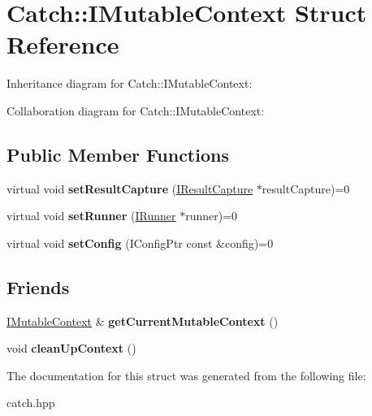 \hypertarget{structCatch_1_1IMutableContext}{}\section{Catch\+:\+:I\+Mutable\+Context Struct Reference}
\label{structCatch_1_1IMutableContext}


Inheritance diagram for Catch\+:\+:I\+Mutable\+Context\+:


Collaboration diagram for Catch\+:\+:I\+Mutable\+Context\+:
\subsection*{Public Member Functions}
\begin{DoxyCompactItemize}
\item 
\mbox{\label{structCatch_1_1IMutableContext_a4a80afd0525b7def21bee8d9b48f2d39}} 
virtual void {\bfseries set\+Result\+Capture} (\hyperlink{structCatch_1_1IResultCapture}{I\+Result\+Capture} $\ast$result\+Capture)=0
\item 
\mbox{\label{structCatch_1_1IMutableContext_af2e53b1dea4527a2587cff266a730f6e}} 
virtual void {\bfseries set\+Runner} (\hyperlink{structCatch_1_1IRunner}{I\+Runner} $\ast$runner)=0
\item 
\mbox{\label{structCatch_1_1IMutableContext_aa81ba080fce084e9482f20338bc88531}} 
virtual void {\bfseries set\+Config} (I\+Config\+Ptr const \&config)=0
\end{DoxyCompactItemize}
\subsection*{Friends}
\begin{DoxyCompactItemize}
\item 
\mbox{\label{structCatch_1_1IMutableContext_aea4b25692aaf4397cdf630716976f6b8}} 
\hyperlink{structCatch_1_1IMutableContext}{I\+Mutable\+Context} \& {\bfseries get\+Current\+Mutable\+Context} ()
\item 
\mbox{\label{structCatch_1_1IMutableContext_ac07cdb7d744cc8f09672d924324b55fd}} 
void {\bfseries clean\+Up\+Context} ()
\end{DoxyCompactItemize}


The documentation for this struct was generated from the following file\+:\begin{DoxyCompactItemize}
\item 
catch.\+hpp\end{DoxyCompactItemize}
